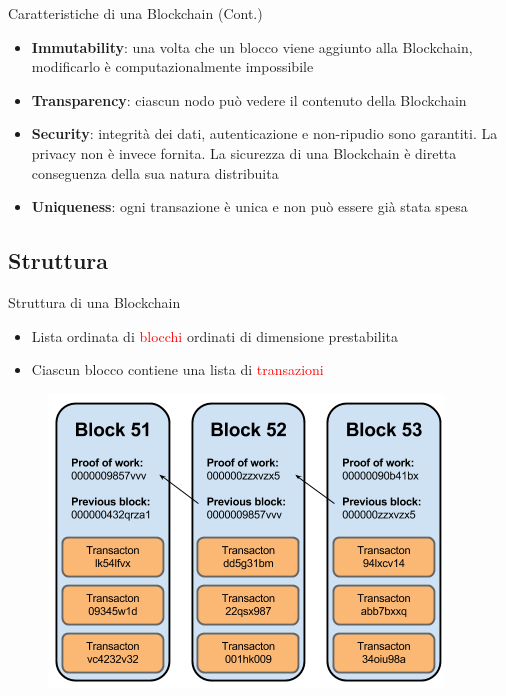 \documentclass{beamer}
\newcommand\red[1]{\textcolor{red}{#1}}
\begin{document}
  \begin{frame}{Caratteristiche di una Blockchain (Cont.)}
    \begin{itemize}
      \item \textbf{Immutability}: una volta che un blocco viene aggiunto alla Blockchain, modificarlo è computazionalmente impossibile \pause
      \item \textbf{Transparency}: ciascun nodo può vedere il contenuto della Blockchain \pause
      \item \textbf{Security}: integrità dei dati, autenticazione e non-ripudio sono garantiti. La privacy non è invece fornita. La sicurezza di una Blockchain è diretta conseguenza della sua natura distribuita \pause
      \item \textbf{Uniqueness}: ogni transazione è unica e non può essere già stata spesa
    \end{itemize}
  \end{frame}



  \subsection{Struttura}
  \begin{frame}{Struttura di una Blockchain}
    \begin{itemize}
      \item Lista ordinata di \red{blocchi} ordinati di dimensione prestabilita 
      \item Ciascun blocco contiene una lista di \red{transazioni}
    \end{itemize}

    \begin{figure}[!htb]
      \centering
      \includegraphics[width=0.45\linewidth]{../img/blockchain-basic-schema.png}
    \end{figure}
  \end{frame}
\end{document}

